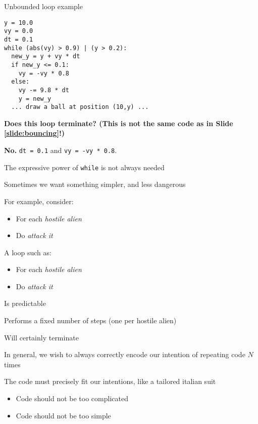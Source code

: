 \documentclass{beamer}
\begin{document}
\begin{frame}[fragile]{Unbounded loop example}
\begin{lstlisting}[basicstyle=\ttfamily\tiny]
y = 10.0
vy = 0.0
dt = 0.1
while (abs(vy) > 0.9) | (y > 0.2):
  new_y = y + vy * dt
  if new_y <= 0.1:
    vy = -vy * 0.8
  else:
    vy -= 9.8 * dt
    y = new_y
  ... draw a ball at position (10,y) ...
\end{lstlisting}

\textbf{Does this loop terminate? (This is not the same code as in Slide \ref{slide:bouncing}!)}

\pause

\textbf{No.} \texttt{dt = 0.1} and \texttt{vy = -vy * 0.8}.
\end{frame}


\begin{slide}{
\item The expressive power of \texttt{while} is not always needed
\item Sometimes we want something simpler, and less dangerous
\item For example, consider:
\begin{itemize}
\item For each \textit{hostile alien}
\item Do \textit{attack it}
\end{itemize}
}\end{slide}

\begin{slide}{
\item A loop such as:
\begin{itemize}
\item For each \textit{hostile alien}
\item Do \textit{attack it}
\end{itemize}
\item Is predictable
\item Performs a fixed number of steps (one per hostile alien)
\item Will certainly terminate
}\end{slide}

\begin{slide}{
\item In general, we wish to always correctly encode our intention of repeating code $N$ times
\item The code must precisely fit our intentions, like a tailored italian suit
\begin{itemize}
\item Code should not be too complicated
\item Code should not be too simple
\end{itemize}
}\end{slide}
\end{document}
